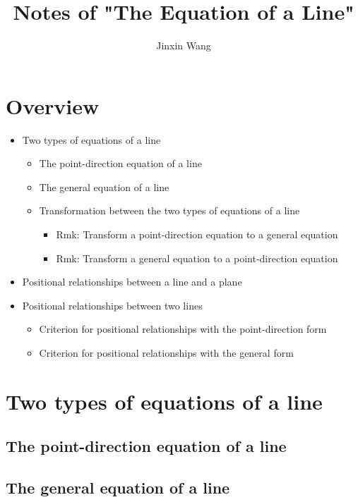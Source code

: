 \documentclass[onecolumn]{ctexart}
\title{Notes of "The Equation of a Line"}
\author{Jinxin Wang}
\date{}
\begin{document}
\maketitle

\section{Overview}
\begin{itemize}
  \item Two types of equations of a line
  \begin{itemize}
    \item The point-direction equation of a line
    \item The general equation of a line
    \item Transformation between the two types of equations of a line
    \begin{itemize}
      \item Rmk: Transform a point-direction equation to a general equation
      \item Rmk: Transform a general equation to a point-direction equation
    \end{itemize}
  \end{itemize}
  \item Positional relationships between a line and a plane
  \item Positional relationships between two lines
  \begin{itemize}
    \item Criterion for positional relationships with the point-direction form
    \item Criterion for positional relationships with the general form
  \end{itemize}
\end{itemize}

\section{Two types of equations of a line}

\subsection{The point-direction equation of a line}

\subsection{The general equation of a line}
\end{document}
